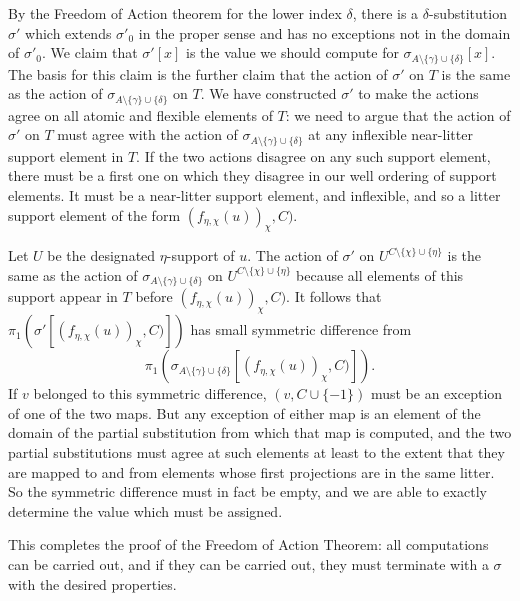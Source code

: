 \documentclass[12pt]{article}
\begin{document}
\begin{enumerate}
By the Freedom of Action theorem for the lower index $\delta$, there is a $\delta$-substitution $\sigma'$ which extends $\sigma'_0$ in the proper sense and has no exceptions not in the domain of $\sigma'_0$.  We claim that $\sigma'[x]$ is the value we should compute for $\sigma_{A \setminus \{\gamma\}\cup \{\delta\}}[x]$.
The basis for this claim is the further claim that the action of $\sigma'$ on $T$ is the same as the action of $\sigma_{A\setminus \{\gamma\}\cup \{\delta\}}$ on $T$.  We have constructed $\sigma'$ to make the actions agree on all atomic and flexible elements of $T$:  we need to argue that the action of $\sigma'$ on $T$ must agree with the action of $\sigma_{A \setminus \{\gamma\}\cup \{\delta\}}$ at any inflexible near-litter support element in $T$.  If the two actions disagree on any such support element, there must be a first one on which they disagree in our well ordering of support elements.  It must be a near-litter support element, and inflexible, and so a litter support element of the form $(f_{\eta,\chi}(u))_\chi,C)$.

Let $U$ be the designated $\eta$-support of $u$.  The action of $\sigma'$ on $U^{C \setminus \{\chi\} \cup \{\eta\}}$ is the same as the action of $\sigma_{A \setminus \{\gamma\}\cup \{\delta\}}$ on $U^{C \setminus \{\chi\} \cup \{\eta\}}$ because all elements of this support appear in $T$ before $(f_{\eta,\chi}(u))_\chi,C)$.  It follows
that $\pi_1(\sigma'[(f_{\eta,\chi}(u))_\chi,C)])$ has small symmetric difference from $$\pi_1(\sigma_{A \setminus \{\gamma\}\cup \{\delta\}}[(f_{\eta,\chi}(u))_\chi,C)]).$$  If $v$ belonged to this symmetric difference, $(v,C \cup\{-1\})$ must be an exception of one of the two maps.   But any exception of either map is an element of the domain
of the partial substitution from which that map is computed, and the two partial substitutions must agree at such elements at least to the extent that they are mapped to and from elements whose first projections are in the same litter.  So the symmetric difference must in fact be empty, and we are able to exactly determine the value which must be assigned.

This completes the proof of the Freedom of Action Theorem:  all computations can be carried out, and if they can be carried out, they must terminate with a $\sigma$ with the desired properties.








\end{enumerate}
\end{document}
